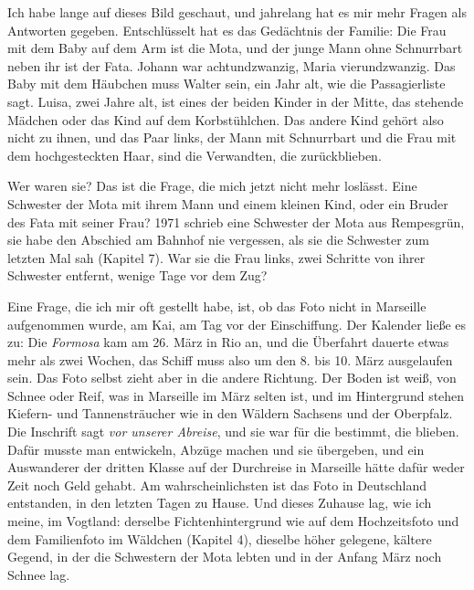 \documentclass[
  ngerman,
  11pt,
  openany]{book}
\begin{document}
Ich habe lange auf dieses Bild geschaut, und jahrelang hat es mir mehr
Fragen als Antworten gegeben. Entschlüsselt hat es das Gedächtnis der
Familie: Die Frau mit dem Baby auf dem Arm ist die Mota, und der junge
Mann ohne Schnurrbart neben ihr ist der Fata. Johann war achtundzwanzig,
Maria vierundzwanzig. Das Baby mit dem Häubchen muss Walter sein, ein
Jahr alt, wie die Passagierliste sagt. Luisa, zwei Jahre alt, ist eines
der beiden Kinder in der Mitte, das stehende Mädchen oder das Kind auf
dem Korbstühlchen. Das andere Kind gehört also nicht zu ihnen, und das
Paar links, der Mann mit Schnurrbart und die Frau mit dem hochgesteckten
Haar, sind die Verwandten, die zurückblieben.

Wer waren sie? Das ist die Frage, die mich jetzt nicht mehr loslässt.
Eine Schwester der Mota mit ihrem Mann und einem kleinen Kind, oder ein
Bruder des Fata mit seiner Frau? 1971 schrieb eine Schwester der Mota
aus Rempesgrün, sie habe den Abschied am Bahnhof nie vergessen, als sie
die Schwester zum letzten Mal sah (Kapitel 7). War sie die Frau links,
zwei Schritte von ihrer Schwester entfernt, wenige Tage vor dem Zug?

Eine Frage, die ich mir oft gestellt habe, ist, ob das Foto nicht in
Marseille aufgenommen wurde, am Kai, am Tag vor der Einschiffung. Der
Kalender ließe es zu: Die \emph{Formosa} kam am 26. März in Rio an, und
die Überfahrt dauerte etwas mehr als zwei Wochen, das Schiff muss also
um den 8. bis 10. März ausgelaufen sein. Das Foto selbst zieht aber in
die andere Richtung. Der Boden ist weiß, von Schnee oder Reif, was in
Marseille im März selten ist, und im Hintergrund stehen Kiefern- und
Tannensträucher wie in den Wäldern Sachsens und der Oberpfalz. Die
Inschrift sagt \emph{vor unserer Abreise}, und sie war für die bestimmt,
die blieben. Dafür musste man entwickeln, Abzüge machen und sie
übergeben, und ein Auswanderer der dritten Klasse auf der Durchreise in
Marseille hätte dafür weder Zeit noch Geld gehabt. Am wahrscheinlichsten
ist das Foto in Deutschland entstanden, in den letzten Tagen zu Hause.
Und dieses Zuhause lag, wie ich meine, im Vogtland: derselbe
Fichtenhintergrund wie auf dem Hochzeitsfoto und dem Familienfoto im
Wäldchen (Kapitel 4), dieselbe höher gelegene, kältere Gegend, in der
die Schwestern der Mota lebten und in der Anfang März noch Schnee lag.
\end{document}
